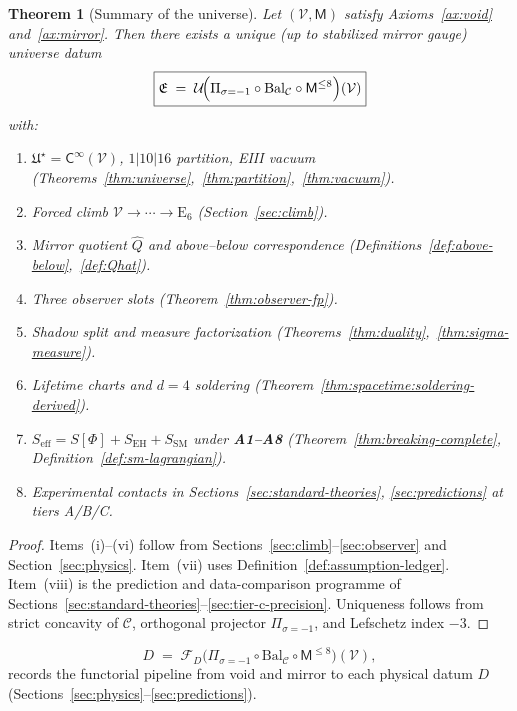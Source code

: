 \documentclass[aps,prd,onecolumn,amsmath,amssymb,nofootinbib,11pt]{revtex4-2}
\numberwithin{equation}{section}
\theoremstyle{plain}
\newtheorem{theorem}{Theorem}[section]
\theoremstyle{definition}
\theoremstyle{remark}
\newcommand{\E}[1]{\mathrm{E}_{#1}}
\newcommand{\Void}{\mathcal{V}}
\newcommand{\Mirror}{\mathsf{M}}
\newcommand{\Climb}{\mathsf{C}}
\newcommand{\capacity}{\mathcal{C}}
\newcommand{\orderparam}{\Phi}
\begin{document}
\begin{theorem}[Summary of the universe]\label{thm:universe-summary}
Let $(\Void,\Mirror)$ satisfy Axioms~\ref{ax:void} and~\ref{ax:mirror}. Then
there exists a unique (up to stabilized mirror gauge) universe datum
\begin{equation}\label{eq:universe-summary}
  \boxed{%
  \mathfrak{E}
  \;=\;
  \mathcal{U}\!\Bigl(
    \Pi_{\sigma=-1}\circ\mathrm{Bal}_{\mathcal{C}}\circ\Mirror^{\leq 8}
  \Bigr)(\Void)}
\end{equation}
with:
\begin{enumerate}[label=(\roman*),leftmargin=*]
  \item $\mathfrak{U}^\star=\Climb^\infty(\Void)$, $1|10|16$ partition, EIII
    vacuum (Theorems~\ref{thm:universe},~\ref{thm:partition},~\ref{thm:vacuum}).
  \item Forced climb $\Void\to\cdots\to\E{6}$ (Section~\ref{sec:climb}).
  \item Mirror quotient $\hat Q$ and above--below correspondence
    (Definitions~\ref{def:above-below},~\ref{def:Qhat}).
  \item Three observer slots (Theorem~\ref{thm:observer-fp}).
  \item Shadow split and measure factorization
    (Theorems~\ref{thm:duality},~\ref{thm:sigma-measure}).
  \item Lifetime charts and $d=4$ soldering
    (Theorem~\ref{thm:spacetime:soldering-derived}).
  \item $S_{\mathrm{eff}}=S[\orderparam]+S_{\mathrm{EH}}+S_{\mathrm{SM}}$
    under \textbf{A1--A8}
    (Theorem~\ref{thm:breaking-complete}, Definition~\ref{def:sm-lagrangian}).
  \item Experimental contacts in Sections~\ref{sec:standard-theories},
    \ref{sec:predictions} at tiers A/B/C.
\end{enumerate}
\end{theorem}

\begin{proof}
Items~(i)--(vi) follow from Sections~\ref{sec:climb}--\ref{sec:observer} and
Section~\ref{sec:physics}. Item~(vii) uses Definition~\ref{def:assumption-ledger}.
Item~(viii) is the prediction and data-comparison programme of
Sections~\ref{sec:standard-theories}--\ref{sec:tier-c-precision}.
Uniqueness follows from strict concavity of $\capacity$, orthogonal projector
$\Pi_{\sigma=-1}$, and Lefschetz index $-3$.
\end{proof}

\begin{equation}\label{eq:master-pipeline}
  D
  \;=\;
  \mathcal{F}_D\!\bigl(
    \Pi_{\sigma=-1}\circ\mathrm{Bal}_{\mathcal{C}}\circ\Mirror^{\leq 8}
  \bigr)(\Void),
\end{equation}
records the functorial pipeline from void and mirror to each physical datum
$D$ (Sections~\ref{sec:physics}--\ref{sec:predictions}).
\end{document}
